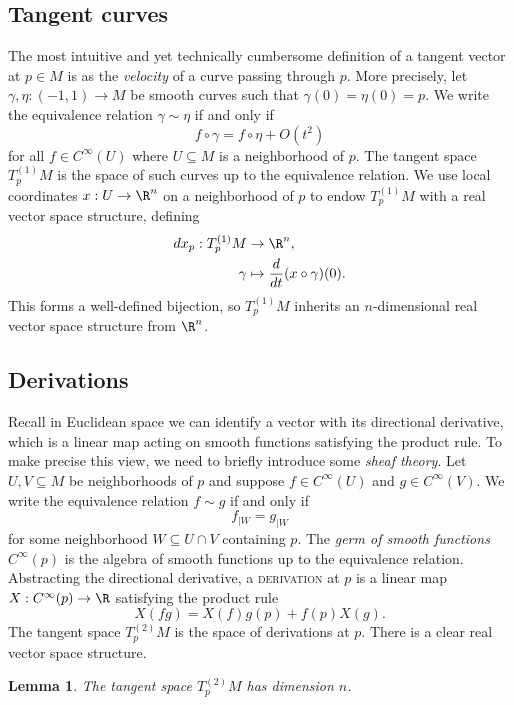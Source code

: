 \documentclass[reqno]{amsart}
\newtheorem{lemma}[theorem]{Lemma}
\theoremstyle{definition}
\theoremstyle{remark}
\renewcommand{\emph}{\textsc}
\begin{document}
\subsection{Tangent curves}

The most intuitive and yet technically cumbersome definition of a tangent vector at $p \in M$ is as the \textit{velocity} of a curve passing through $p$. More precisely, let $\gamma, \eta : (-1, 1) \to M$ be smooth curves such that $\gamma(0) = \eta(0) = p$. We write the equivalence relation $\gamma \sim \eta$ if and only if 
	\[ f \circ \gamma = f \circ \eta + O(t^2) \]
for all $f \in C^\infty(U)$ where $U \subseteq M$ is a neighborhood of $p$. The tangent space $T_p^{(1)} M$ is the space of such curves up to the equivalence relation. We use local coordinates $x : U \to \R^n$ on a neighborhood of $p$ to endow $T^{(1)}_p M$ with a real vector space structure, defining
	\begin{align*}
		dx_p : T^{(1)}_p M 
			&\to \R^n, \\
		\gamma 
			&\mapsto \frac{d}{dt}(x \circ \gamma) (0).
	\end{align*}
This forms a well-defined bijection, so $T^{(1)}_p M$ inherits an $n$-dimensional real vector space structure from $\R^n$. 
	
\subsection{Derivations}

	Recall in Euclidean space we can identify a vector with its directional derivative, which is a linear map acting on smooth functions satisfying the product rule. To make precise this view, we need to briefly introduce some \textit{sheaf theory}. Let $U, V \subseteq M$ be neighborhoods of $p$ and suppose $f \in C^\infty (U)$ and $g \in C^\infty (V)$. We write the equivalence relation $f \sim g$ if and only if 
		\[ f_{|W} = g_{|W}  \]
	for some neighborhood $W \subseteq U \cap V$ containing $p$. The \textit{germ of smooth functions} $C^\infty (p)$ is the algebra of smooth functions up to the equivalence relation. Abstracting the directional derivative, a \emph{derivation} at $p$ is a linear map $X: C^\infty (p) \to \R$ satisfying the product rule
		\[ X(fg) = X(f) g(p) + f(p) X(g). \]
	The tangent space $T^{(2)}_p M$ is the space of derivations at $p$. There is a clear real vector space structure.
	
	\begin{lemma}
		The tangent space $T^{(2)}_p M$ has dimension $n$. 
	\end{lemma}
	
\end{document}
